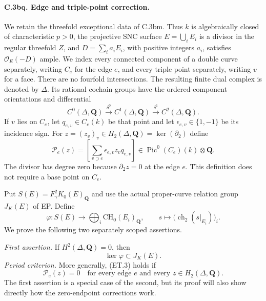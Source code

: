 \paragraph{C.3bq. Edge and triple-point correction.}
We retain the threefold exceptional data of C.3bm. Thus $k$ is
algebraically closed of characteristic $p>0$, the projective SNC surface
$E=\bigcup_iE_i$ is a divisor in the regular threefold $Z$, and
$D=\sum_i a_iE_i$, with positive integers $a_i$, satisfies
$\mathcal O_E(-D)$ ample. We index every connected component of a double
curve separately, writing $C_e$ for the edge $e$, and every triple point
separately, writing $v$ for a face. There are no fourfold intersections.
The resulting finite dual complex is denoted by $\Delta$. Its rational
cochain groups have the ordered-component orientations and differential
\[
 C^0(\Delta,\mathbf Q)\xrightarrow{\delta^0}
 C^1(\Delta,\mathbf Q)\xrightarrow{\delta^1}
 C^2(\Delta,\mathbf Q).
\]
If $v$ lies on $C_e$, let $q_{e,v}\in C_e(k)$ be that point and let
$\epsilon_{e,v}\in\{1,-1\}$ be its incidence sign. For
$z=(z_v)_v\in H_2(\Delta,\mathbf Q)=\ker(\partial_2)$ define
\begin{equation}
 \mathcal P_e(z)=
 \left[\sum_{v\supset e}\epsilon_{e,v}z_vq_{e,v}\right]
       \in\operatorname{Pic}^0(C_e)(k)\otimes\mathbf Q.
                                                        \tag{ET.1}
\end{equation}
The divisor has degree zero because $\partial_2z=0$ at the edge $e$.
This definition does not require a base point on $C_e$.

Put $S(E)=F_\gamma^2K_0(E)_{\mathbf Q}$ and use the actual proper-curve
relation group $J_K(E)$ of EP. Define
\begin{equation}
 \varphi:S(E)\longrightarrow
          \bigoplus_i\mathrm{CH}_0(E_i)_{\mathbf Q},\qquad
 s\longmapsto\bigl(\operatorname{ch}_2(s|_{E_i})\bigr)_i.
                                                        \tag{ET.2}
\end{equation}
We prove the following two separately scoped assertions.

\emph{First assertion.} If $H^2(\Delta,\mathbf Q)=0$, then
\begin{equation}
                         \ker\varphi\subset J_K(E).     \tag{ET.3}
\end{equation}
\emph{Period criterion.} More generally, (ET.3) holds if
\begin{equation}
 \mathcal P_e(z)=0\quad\text{for every edge $e$ and every }
                 z\in H_2(\Delta,\mathbf Q).             \tag{ET.4}
\end{equation}
The first assertion is a special case of the second, but its proof will
also show directly how the zero-endpoint corrections work.

